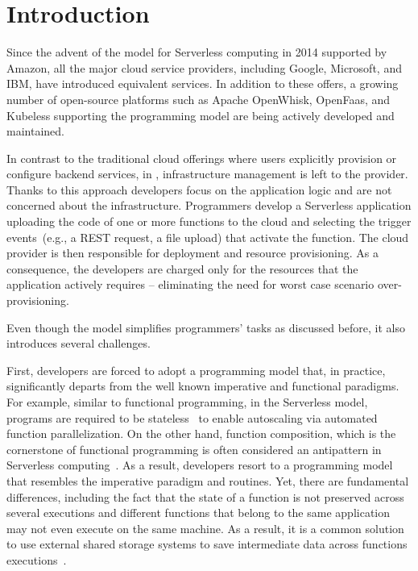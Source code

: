 
\section{Introduction}

Since the advent of the \faas model for Serverless computing in 2014  
supported by Amazon,
all the major cloud service providers, including 
Google,
Microsoft,
and IBM,
have introduced equivalent services. 
%
In addition to these offers, a growing number of open-source platforms 
such as Apache OpenWhisk,
OpenFaas,
and Kubeless
supporting the \faas programming model are being actively developed and maintained.

In contrast to the traditional cloud offerings where users explicitly provision or configure 
backend services, in \faas, infrastructure management is left to the provider.
Thanks to this approach developers focus on the application logic and 
are not concerned about the infrastructure. 
Programmers develop a Serverless application uploading the code of one or more 
functions to the cloud and selecting the trigger events~(e.g., a REST request, 
a file upload) that activate the function. The cloud provider is then responsible for 
deployment and resource provisioning. As a consequence, the developers are  
charged only for the resources that the application actively requires -- eliminating the 
need for worst case scenario over-provisioning.

Even though the \faas model simplifies programmers' tasks 
as discussed before, it also introduces several challenges.

First, developers are forced to adopt a programming model that, in practice,
significantly departs from the well known imperative and functional paradigms.
For example, similar to functional programming, in the Serverless model, 
programs are required to be stateless~\cite{hellerstein2018serverless} 
to enable autoscaling via automated function parallelization.
On the other hand, function composition, which is the cornerstone of functional programming
is often considered an antipattern in Serverless computing~\cite{baldini2017serverless}.
%
As a result, developers resort to a programming model that 
resembles the imperative paradigm and routines.
Yet, there are fundamental differences, including the fact that 
the state of a function is not preserved across several executions and
different functions that belong to the same application may not even execute 
on the same machine. As a result, it is a common solution 
to use external shared storage systems 
to save intermediate data across functions 
executions~\cite{klimovic2018understanding}.


